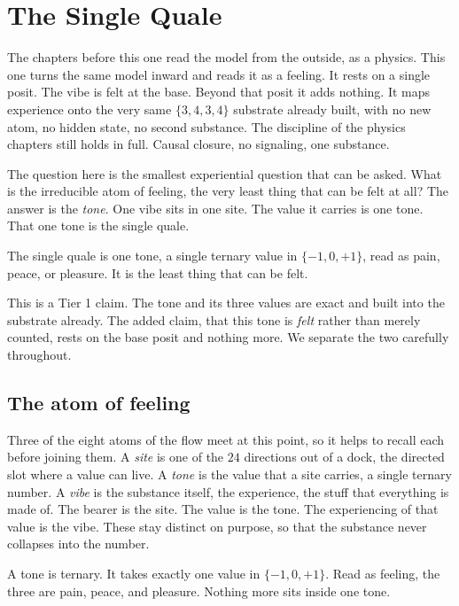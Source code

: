 \section{The Single Quale}

The chapters before this one read the model from the outside, as a physics. This one turns the same model inward and reads it as a feeling. It rests on a single posit. The vibe is felt at the base. Beyond that posit it adds nothing. It maps experience onto the very same $\{3,4,3,4\}$ substrate already built, with no new atom, no hidden state, no second substance. The discipline of the physics chapters still holds in full. Causal closure, no signaling, one substance.

The question here is the smallest experiential question that can be asked. What is the irreducible atom of feeling, the very least thing that can be felt at all? The answer is the \emph{tone}. One vibe sits in one site. The value it carries is one tone. That one tone is the single quale.

\begin{principle}
The single quale is one tone, a single ternary value in $\{-1, 0, +1\}$, read as pain, peace, or pleasure. It is the least thing that can be felt.
\end{principle}

This is a Tier 1 claim. The tone and its three values are exact and built into the substrate already. The added claim, that this tone is \emph{felt} rather than merely counted, rests on the base posit and nothing more. We separate the two carefully throughout.

\subsection{The atom of feeling}

Three of the eight atoms of the flow meet at this point, so it helps to recall each before joining them. A \emph{site} is one of the $24$ directions out of a dock, the directed slot where a value can live. A \emph{tone} is the value that a site carries, a single ternary number. A \emph{vibe} is the substance itself, the experience, the stuff that everything is made of. The bearer is the site. The value is the tone. The experiencing of that value is the vibe. These stay distinct on purpose, so that the substance never collapses into the number.

A tone is ternary. It takes exactly one value in $\{-1, 0, +1\}$. Read as feeling, the three are pain, peace, and pleasure. Nothing more sits inside one tone.

